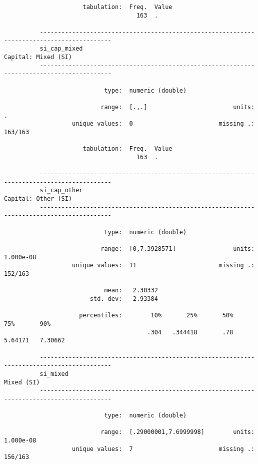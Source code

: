 \documentclass{article}
\begin{document}
\begin{verbatim}
                      tabulation:  Freq.  Value
                                     163  .
          
          ------------------------------------------------------------------------------------------
          si_cap_mixed                                                           Capital: Mixed (SI)
          ------------------------------------------------------------------------------------------
          
                            type:  numeric (double)
          
                           range:  [.,.]                        units:  .
                   unique values:  0                        missing .:  163/163
          
                      tabulation:  Freq.  Value
                                     163  .
          
          ------------------------------------------------------------------------------------------
          si_cap_other                                                           Capital: Other (SI)
          ------------------------------------------------------------------------------------------
          
                            type:  numeric (double)
          
                           range:  [0,7.3928571]                units:  1.000e-08
                   unique values:  11                       missing .:  152/163
          
                            mean:   2.30332
                        std. dev:   2.93384
          
                     percentiles:        10%       25%       50%       75%       90%
                                        .304   .344418       .78   5.64171   7.30662
          
          ------------------------------------------------------------------------------------------
          si_mixed                                                                        Mixed (SI)
          ------------------------------------------------------------------------------------------
          
                            type:  numeric (double)
          
                           range:  [.29000001,7.6999998]        units:  1.000e-08
                   unique values:  7                        missing .:  156/163
          

\end{verbatim}
\end{document}
